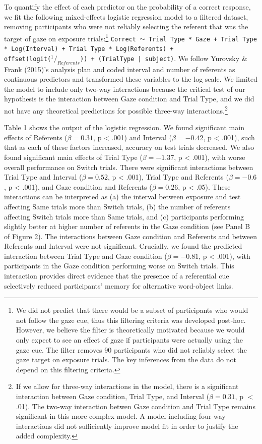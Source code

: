 \documentclass[authoryear, review]{elsarticle}
\begin{document}
To quantify the effect of each predictor on the probability of a correct
response, we fit the following mixed-effects logistic regression model
to a filtered dataset, removing participants who were not reliably
selecting the referent that was the target of gaze on exposure
trials:\footnote{We did not predict that there would be a subset of participants who would not follow the gaze cue, thus this filtering criteria was developed post-hoc. However, we believe the filter is theoretically motivated because we would only expect to see an effect of gaze if participants were actually using the gaze cue. The filter removes 90 participants who did not reliably select the gaze target on exposure trials. The key inferences from the data do not depend on this filtering criteria.}
\texttt{Correct $\sim$ Trial Type * Gaze + Trial Type * Log(Interval) + Trial Type * Log(Referents) + \\ offset(logit($^1/_{Referents}$)) + (TrialType | subject)}.
We follow Yurovsky \& Frank (2015)'s analysis plan and coded interval
and number of referents as continuous predictors and transformed these
variables to the log scale. We limited the model to include only two-way
interactions because the critical test of our hypothesis is the
interaction between Gaze condition and Trial Type, and we did not have
any theoretical predictions for possible three-way
interactions.\footnote{If we allow for three-way interactions in the model, there is a significant interaction between Gaze condition, Trial Type, and Interval ($\beta = 0.31$, p $<$ .01). The two-way interaction betwen Gaze condition and Trial Type remains significant in this more complex model. A model including four-way interactions did not sufficiently improve model fit in order to justify the added complexity.}

Table 1 shows the output of the logistic regression. We found
significant main effects of Referents (\(\beta = 0.31\), p \textless{}
.001) and Interval (\(\beta = -0.42\), p \textless{} .001), such that as
each of these factors increased, accuracy on test trials decreased. We
also found significant main effects of Trial Type (\(\beta = -1.37\), p
\textless{} .001), with worse overall performance on Switch trials.
There were significant interactions between Trial Type and Interval
(\(\beta = 0.52\), p \textless{} .001), Trial Type and Referents
(\(\beta = -0.6\), p \textless{} .001), and Gaze condition and Referents
(\(\beta = 0.26\), p \textless{} .05). These interactions can be
interpreted as (a) the interval between exposure and test affecting Same
trials more than Switch trials, (b) the number of referents affecting
Switch trials more than Same trials, and (c) participants performing
slightly better at higher number of referents in the Gaze condition (see
Panel B of Figure 2). The interactions between Gaze condition and
Referents and between Referents and Interval were not significant.
Crucially, we found the predicted interaction between Trial Type and
Gaze condition (\(\beta = -0.81\), p \textless{} .001), with
participants in the Gaze condition performing worse on Switch trials.
This interaction provides direct evidence that the presence of a
referential cue selectively reduced participants' memory for alternative
word-object links.
\end{document}
